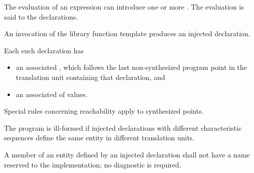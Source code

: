 \pnum
The evaluation of an expression can introduce
one or more .
The evaluation is said to  the declarations.
\begin{note}
An invocation of
the library function template 
produces an injected declaration.
\end{note}
Each such declaration has
\begin{itemize}
\item
an associated ,
which follows the last non-synthesized program point
in the translation unit containing that declaration, and
\item
an associated  of values.
\end{itemize}
\begin{note}
Special rules concerning reachability
apply to synthesized points.
\end{note}
\begin{note}
The program is ill-formed
if injected declarations with different characteristic sequences
define the same entity in different translation units.
\end{note}

\pnum
A member of an entity defined by an injected declaration
shall not have a name reserved to the implementation;
no diagnostic is required.

